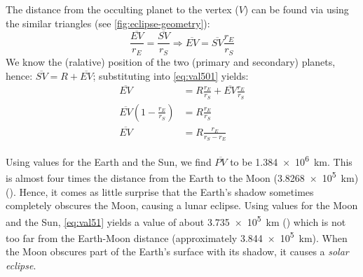 The distance from the occulting planet to the vertex (\(V\)) can be found via 
using the similar triangles (see \ref{fig:eclipse-geometry}):
\begin{equation}
    \label{eq:val501}
    \frac{\overline{EV}}{r_{E}} = \frac{\overline{SV}}{r_S} \Rightarrow \overline{EV} = \overline{SV} \frac{r_E}{r_S}
\end{equation}
We know the (ralative) position of the two (primary and secondary) planets, hence:
\(\overline{SV} = R + \overline{EV}\); substituting into \ref{eq:val501} yields:
\begin{align*}
    \label{eq:val51}
    \overline{EV} &= R \frac{r_E}{r_S} + \overline{EV} \frac{r_E}{r_S} \\
    \overline{EV} (1-\frac{r_E}{r_S}) &= R \frac{r_E}{r_S} \\
    \overline{EV} &= R \frac{r_E}{r_S - r_E}
\end{align*}

Using values for the Earth and the Sun, we find \(\overline{PV}\) to 
be \SI{1.384e6}{\km}. This is almost four times the distance from the 
Earth to the Moon (\SI{3.8268e5}{\km}) (\cite{Vallado}). Hence, it comes as little surprise 
that the Earth's shadow sometimes completely obscures the Moon, causing a 
lunar eclipse. Using values for the Moon and the Sun, 
\ref{eq:val51} yields a value of about \SI{3.735e5}{\km} (\cite{Vallado}) 
which is not too far from the Earth-Moon distance (approximately 
\SI{3.844e5}{\km}). When the Moon obscures part of the Earth's surface with its 
shadow, it causes a \emph{solar eclipse}.
\fi
